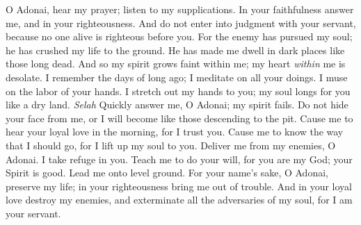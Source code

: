 \begin{biblechapter} %
 O Adonai, hear my prayer; 
listen to my supplications. 
In your faithfulness answer me, 
and in your righteousness.
\verse And do not enter into judgment with your servant, 
because no one alive is righteous before you.
\verse For the enemy has pursued my soul; 
he has crushed my life to the ground. 
He has made me dwell in dark places 
like those long dead.
\verse And so my spirit grows faint within me; 
my heart \textit{within} me is desolate.
\verse I remember the days of long ago; 
I meditate on all your doings. 
I muse on the labor of your hands.
\verse I stretch out my hands to you; 
my soul longs for you like a dry land. \textit{Selah}
\verse Quickly answer me, O Adonai; 
my spirit fails. 
Do not hide your face from me, 
or I will become 
like those descending to the pit.
\verse Cause me to hear your loyal love in the morning, 
for I trust you. 
Cause me to know the way that I should go, 
for I lift up my soul to you.
\verse Deliver me from my enemies, O Adonai. 
I take refuge in you.
\verse Teach me to do your will, for you are my God; 
your Spirit is good. 
Lead me onto level ground.
\verse For your name’s sake, O Adonai, preserve my life; 
in your righteousness bring me out of trouble.
\verse And in your loyal love destroy my enemies, 
and exterminate all the adversaries of my soul, 
for I am your servant.
\end{biblechapter}

